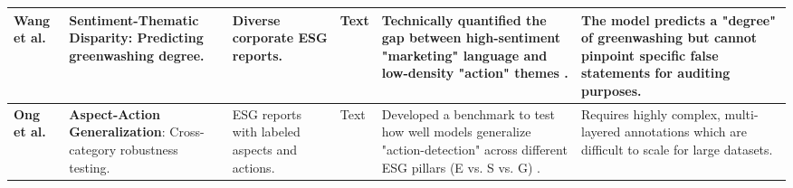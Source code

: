 \begin{landscape}
\begin{table}[p]
\begin{tabularx}{\linewidth}{|p{1.8cm}|p{3cm}|p{3cm}|p{1.8cm}|X|X|}
\textbf{Wang et al.}  \parencite{xiaojia_wang_02351a60} & \textbf{Sentiment-Thematic Disparity}: Predicting greenwashing degree. & Diverse corporate ESG reports. & Text & Technically quantified the gap between high-sentiment "marketing" language and low-density "action" themes  \parencite{xiaojia_wang_02351a60}. & The model predicts a "degree" of greenwashing but cannot pinpoint specific false statements for auditing purposes. \\ \hline
\textbf{Ong et al.}  \parencite{keane_ong_369a0b63} & \textbf{Aspect-Action Generalization}: Cross-category robustness testing. & ESG reports with labeled aspects and actions. & Text & Developed a benchmark to test how well models generalize "action-detection" across different ESG pillars (E vs. S vs. G)  \parencite{keane_ong_369a0b63}. & Requires highly complex, multi-layered annotations which are difficult to scale for large datasets. \\ \hline
\end{tabularx}
\end{table}
\end{landscape}
